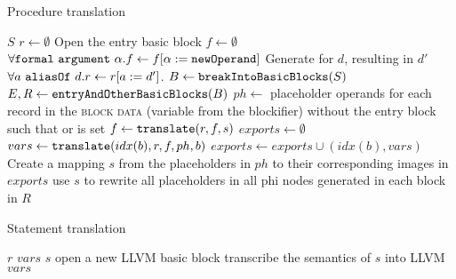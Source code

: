 \begin{algorithm}
    \caption{Procedure translation}
    \label{trans_proc}
    \begin{algorithmic}[1]
        \Require $S$ 
        \State $r \gets \emptyset$ 
        \State Open the entry basic block
        \State $f \gets \emptyset$ 
        \State $\forall \mathtt{formal\ argument}\ \alpha . f \gets f [ \alpha := \mathtt{newOperand}]$
            \State Generate  for $d$, resulting in $d'$
            \State $\forall  a\ \mathtt{aliasOf}\ d .  r \gets r[a := d']$. 
        \EndFor
        \State $B \gets \mathtt{breakIntoBasicBlocks} (S)$ 
        \State $E,R \gets \mathtt{entryAndOtherBasicBlocks}(B)$
        \State $ph \gets$ placeholder operands for each record in the \textsc{block data} (variable from the blockifier) without the entry block such that  or  is set
            \State $f \gets \mathtt{translate}(r, f, s)$ 
        \EndFor
        \State $exports \gets \emptyset$ 
            \State $vars \gets \mathtt{translate}(idx(b), r, f, ph, b)$ 
            \State $exports \gets exports \cup (idx(b),vars)$
        \EndFor
        \State Create a mapping $s$ from the placeholders in $ph$ to their corresponding images in $exports$
        \State use $s$ to rewrite all placeholders in all phi nodes generated in each block in $R$
    \end{algorithmic}
\end{algorithm}

\begin{algorithm}
    \caption{Statement translation}
    \label{transl_stmt}
    \begin{algorithmic}[1]
        \Require $r$ 
        \Require $vars$ 
        \Require $s$ 
            \State open a new LLVM basic block
        \Else
            \State transcribe the semantics of $s$ into LLVM
            \State {}
            \State {}
        \EndIf
        \State \Return $vars$
    \end{algorithmic}
\end{algorithm}

